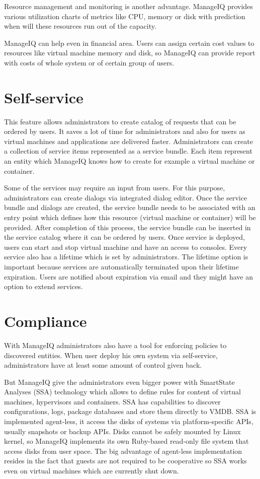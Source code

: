 Resource management and monitoring is another advantage. ManageIQ provides various utilization charts of metrics like CPU, memory or disk with prediction when will these resources run out of the capacity.

ManageIQ can help even in financial area. Users can assign certain cost values to resources like virtual machine memory and disk, so ManageIQ can provide report with costs of whole system or of certain group of users.

\section{Self-service}
This feature allows administrators to create catalog of requests that can be ordered by users. It saves a lot of time for administrators and also for users as virtual machines and applications are delivered faster. Administrators can create a collection of service items represented as a service bundle. Each item represent an entity which ManageIQ knows how to create for example a virtual machine or container. 

Some of the services may require an input from users. For this purpose, administrators can create dialogs via integrated dialog editor. Once the service bundle and dialogs are created, the service bundle needs to be associated with an entry point which defines how this resource (virtual machine or container) will be provided. After completion of this process, the service bundle can be inserted in the service catalog where it can be ordered by users. Once service is deployed, users can start and stop virtual machine and have an access to consoles. Every service also has a lifetime which is set by administrators. The lifetime option is important because services are automatically terminated upon their lifetime expiration. Users are notified about expiration via email and they might have an option to extend services.

\section{Compliance}
With ManageIQ administrators also have a tool for enforcing policies to discovered entities. When user deploy his own system via self-service, administrators have at least some amount of control given back.

But ManageIQ give the administrators even bigger power with SmartState Analyses (SSA) technology which allows to define rules for content of virtual machines, hypervisors and containers. SSA has capabilities to discover configurations, logs, package databases and store them directly to VMDB. SSA is implemented agent-less, it access the disks of systems via platform-specific APIs, usually snapshots or backup APIs. Disks cannot be safely mounted by Linux kernel, so ManageIQ implements its own Ruby-based read-only file system that access disks from user space. The big advantage of agent-less implementation resides in the fact that guests are not required to be cooperative so SSA works even on virtual machines which are currently shut down.

